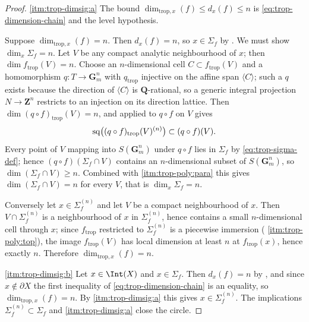 \begin{proof}
\cref{itm:trop-dimsig:a} The bound $\dim_{\mathrm{trop},x}(f)\le d_x(f)\le n$
is \eqref{eq:trop-dimension-chain} and the level hypothesis.

Suppose $\dim_{\mathrm{trop},x}(f)=n$. Then $d_x(f)=n$, so $x\in\Sigma_f$
by . We must show
$\dim_x\Sigma_f=n$. Let $V$ be any compact analytic neighbourhood of $x$;
then $\dim f_{\mathrm{trop}}(V)=n$. Choose an $n$-dimensional cell
$C\subset f_{\mathrm{trop}}(V)$ and a homomorphism $q:T\to\mathbf G_m^n$
with $q_{\mathrm{trop}}$ injective on the affine span $\langle C\rangle$;
such a $q$ exists because the direction of $\langle C\rangle$ is
$\mathbf Q$-rational, so a generic integral projection $N\to\mathbf Z^n$
restricts to an injection on its direction lattice. Then
$\dim(q\circ f)_{\mathrm{trop}}(V)=n$, and
 applied to $q\circ f$ on $V$ gives
\[
 \operatorname{sq}\bigl((q\circ f)_{\mathrm{trop}}(V)^{(n)}\bigr)\subset(q\circ f)(V).
\]
Every point of $V$ mapping into $S(\mathbf G_m^n)$ under $q\circ f$ lies in
$\Sigma_f$ by \eqref{eq:trop-sigma-def}; hence $(q\circ f)(\Sigma_f\cap V)$
contains an $n$-dimensional subset of $S(\mathbf G_m^n)$, so
$\dim(\Sigma_f\cap V)\ge n$. Combined with
 \cref{itm:trop-poly:para} this gives
$\dim(\Sigma_f\cap V)=n$ for every $V$, that is $\dim_x\Sigma_f=n$.

Conversely let $x\in\Sigma_f^{(n)}$ and let $V$ be a compact neighbourhood
of $x$. Then $V\cap\Sigma_f^{(n)}$ is a neighbourhood of $x$ in
$\Sigma_f^{(n)}$, hence contains a small $n$-dimensional cell through $x$;
since
$f_{\mathrm{trop}}$ restricted to $\Sigma_f^{(n)}$ is a piecewise immersion
( \cref{itm:trop-poly:top}), the image
$f_{\mathrm{trop}}(V)$ has local dimension at least $n$ at
$f_{\mathrm{trop}}(x)$, hence exactly $n$.
Therefore $\dim_{\mathrm{trop},x}(f)=n$.

\cref{itm:trop-dimsig:b} Let $x\in\Int(X)$ and $x\in\Sigma_f$. Then
$d_x(f)=n$ by , and since
$x\notin\partial X$ the first inequality of \eqref{eq:trop-dimension-chain}
is an equality, so $\dim_{\mathrm{trop},x}(f)=n$. By
\cref{itm:trop-dimsig:a} this gives $x\in\Sigma_f^{(n)}$. The implications
$\Sigma_f^{(n)}\subset\Sigma_f$ and \cref{itm:trop-dimsig:a} close the
circle.


\end{proof}
